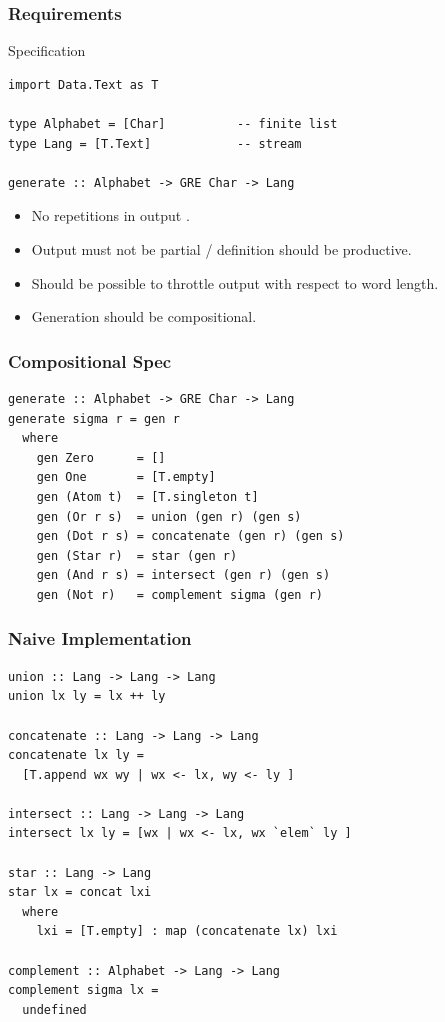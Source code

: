 \documentclass[pdftex,aspectratio=169]{beamer}
\begin{document}
\begin{frame}[fragile]
  \frametitle{Requirements}
  \begin{block}{Specification}
\begin{lstlisting}[numbers=none]
import Data.Text as T

type Alphabet = [Char]          -- finite list
type Lang = [T.Text]            -- stream

generate :: Alphabet -> GRE Char -> Lang
\end{lstlisting}
  \end{block}
  \begin{itemize}
  \item No repetitions in output .
  \item Output must not be partial / definition should be productive.
  \item Should be possible to throttle output with respect to word length.
  \item Generation should be compositional.
  \end{itemize}
\end{frame}
\begin{frame}[fragile]
  \frametitle{Compositional Spec}
\begin{lstlisting}[numbers=none]
generate :: Alphabet -> GRE Char -> Lang
generate sigma r = gen r
  where
    gen Zero      = []
    gen One       = [T.empty]
    gen (Atom t)  = [T.singleton t]
    gen (Or r s)  = union (gen r) (gen s)
    gen (Dot r s) = concatenate (gen r) (gen s)
    gen (Star r)  = star (gen r)
    gen (And r s) = intersect (gen r) (gen s)
    gen (Not r)   = complement sigma (gen r)
\end{lstlisting}
\end{frame}
\begin{frame}[fragile]
  \frametitle{Naive Implementation}
\vspace{-2\baselineskip}
\begin{lstlisting}[numbers=none]
union :: Lang -> Lang -> Lang
union lx ly = lx ++ ly

concatenate :: Lang -> Lang -> Lang
concatenate lx ly =
  [T.append wx wy | wx <- lx, wy <- ly ]

intersect :: Lang -> Lang -> Lang
intersect lx ly = [wx | wx <- lx, wx `elem` ly ]

star :: Lang -> Lang
star lx = concat lxi
  where
    lxi = [T.empty] : map (concatenate lx) lxi

complement :: Alphabet -> Lang -> Lang
complement sigma lx =
  undefined
\end{lstlisting}
\end{frame}
\end{document}
